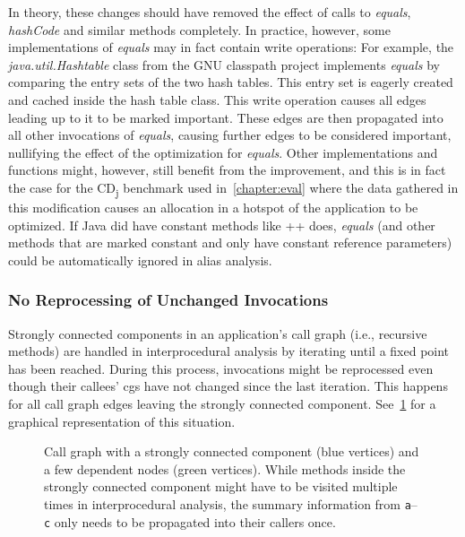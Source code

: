 				In theory, these changes should have removed the effect of calls to \emph{equals}, \emph{hashCode} and similar
				methods completely. In practice, however, some implementations of \emph{equals} may in fact contain write
				operations: For example, the \emph{java.util.Hashtable} class from the GNU classpath project implements
				\emph{equals} by comparing the entry sets of the two hash tables. This entry set is eagerly created and cached
				inside the hash table class. This write operation causes all edges leading up to it to be marked important.
				These edges are then propagated into all other invocations of \emph{equals}, causing further edges to be
				considered important, nullifying the effect of the optimization for \emph{equals}. Other implementations and
				functions might, however, still benefit from the improvement, and this is in fact the case for the
				CD\textsubscript{j} benchmark used in~\cref{chapter:eval} where the data gathered in this modification causes an
				allocation in a hotspot of the application to be optimized. If Java did have constant methods like \C++{} does,
				\emph{equals} (and other methods that are marked constant and only have constant reference parameters) could be
				automatically ignored in alias analysis.

			\subsubsection{No Reprocessing of Unchanged Invocations}
				\label{subsub:ea:improve:opt:quick-fixpoint}
				Strongly connected components in an application's call graph (i.e., recursive methods) are handled in
				interprocedural analysis by iterating until a fixed point has been reached. During this process, invocations
				might be reprocessed even though their callees' \glspl{cg} have not changed since the last iteration. This
				happens for all call graph edges leaving the strongly connected component.
				See~\cref{fig:ea:improve:quick-fixpoint} for a graphical representation of this situation.

				\begin{figure}
					\centering%

					\caption[Example call graph where avoiding reprocessing saves time]{%
						Call graph with a strongly connected component (blue {\color{cgblue}\blacksquare} vertices) and a few
						dependent nodes (green {\color{cggreen}\blacksquare} vertices). While methods inside the strongly connected
						component might have to be visited multiple times in interprocedural analysis, the summary information from
						\texttt{a}–\texttt{c} only needs to be propagated into their callers once.}%
					\label{fig:ea:improve:quick-fixpoint}%
				\end{figure}

